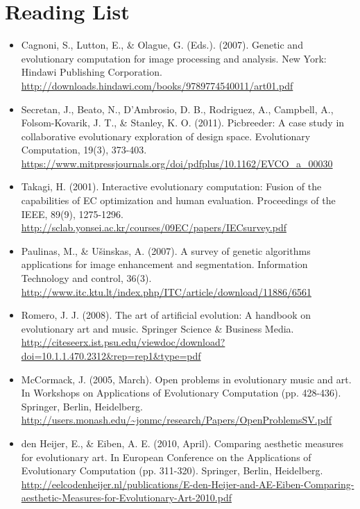 \documentclass[10pt,a4paper]{article}
\begin{document}
\section{Reading List}
\begin{itemize}
	
	\item Cagnoni, S., Lutton, E., \& Olague, G. (Eds.). (2007). Genetic and evolutionary computation for image processing and analysis. New York: Hindawi Publishing Corporation.
	\\
	\url{http://downloads.hindawi.com/books/9789774540011/art01.pdf}
	
	\item Secretan, J., Beato, N., D'Ambrosio, D. B., Rodriguez, A., Campbell, A., Folsom-Kovarik, J. T., \& Stanley, K. O. (2011). Picbreeder: A case study in collaborative evolutionary exploration of design space. Evolutionary Computation, 19(3), 373-403.
	\\
	\url{https://www.mitpressjournals.org/doi/pdfplus/10.1162/EVCO_a_00030}
	
	\item Takagi, H. (2001). Interactive evolutionary computation: Fusion of the capabilities of EC optimization and human evaluation. Proceedings of the IEEE, 89(9), 1275-1296.
	\\
	\url{http://sclab.yonsei.ac.kr/courses/09EC/papers/IECsurvey.pdf}
	
	\item Paulinas, M., \& Ušinskas, A. (2007). A survey of genetic algorithms applications for image enhancement and segmentation. Information Technology and control, 36(3).
	\\
	\url{http://www.itc.ktu.lt/index.php/ITC/article/download/11886/6561}
	
	\item Romero, J. J. (2008). The art of artificial evolution: A handbook on evolutionary art and music. Springer Science \& Business Media.
	\\
	\url{http://citeseerx.ist.psu.edu/viewdoc/download?doi=10.1.1.470.2312&rep=rep1&type=pdf}
	
	\item McCormack, J. (2005, March). Open problems in evolutionary music and art. In Workshops on Applications of Evolutionary Computation (pp. 428-436). Springer, Berlin, Heidelberg.
	\\
	\url{http://users.monash.edu/~jonmc/research/Papers/OpenProblemsSV.pdf}
	
	\item den Heijer, E., \& Eiben, A. E. (2010, April). Comparing aesthetic measures for evolutionary art. In European Conference on the Applications of Evolutionary Computation (pp. 311-320). Springer, Berlin, Heidelberg.
	\\
	\url{http://eelcodenheijer.nl/publications/E-den-Heijer-and-AE-Eiben-Comparing-aesthetic-Measures-for-Evolutionary-Art-2010.pdf}
	

\end{itemize}
\end{document}
